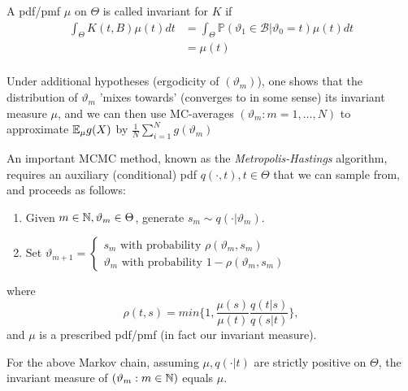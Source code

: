 \documentclass[a4paper]{article}
\begin{document}
A pdf/pmf  $\mu$ on $\Theta$ is called invariant for $K$ if
\begin{align*}
	\int_{\Theta} K(t,B) \mu(t) dt &= \int_{\Theta} \mathbb{P}\left( \vartheta_1 \in \mathcal{B} | \vartheta_0 = t \right) \mu(t) dt \\
	&= \mu(t) \\
\end{align*}

Under additional hypotheses (ergodicity of $(\vartheta_m)$), one shows that the distribution of  $\vartheta_m$ 'mixes towards' (converges to in some sense) its invariant measure $\mu$, and we can then use MC-averages $(\vartheta_m : m=1,\ldots,N)$ to approximate $\mathbb{E}_{\mu} g(X)$ by $\frac{1}{N} \sum_{i=1}^{N}g(\vartheta_m)$

An important MCMC method, known as the \textit{Metropolis-Hastings} algorithm, requires an auxiliary (conditional) pdf $q(\cdot , t), t\in \Theta$ that we can sample from, and proceeds as follows:
\begin{enumerate}
	\item Given $m\in \mathbb{N}, \vartheta_m \in \Theta$, generate $s_m \sim q(\cdot |\vartheta_m)$.
	\item Set $\vartheta_{m+1} = \begin{cases}
			s_m \text{ with probability } \rho(\vartheta_m, s_m) \\
			\vartheta_m \text{ with probability } 1 - \rho(\vartheta_m, s_m)
	\end{cases}$ 
\end{enumerate}
where
\[         
	\rho(t,s) = min\{ 1,  \frac{\mu(s)}{\mu(t)} \frac{q(t|s)}{q(s|t)} \} 
,\]        
and $\mu$ is a prescribed pdf/pmf (in fact our invariant measure).

\begin{prop}
	For the above Markov chain, assuming $\mu, q(\cdot |t)$ are strictly positive on $\Theta$, the invariant measure of $(\vartheta_m : m \in \mathbb{N})$ equals $\mu$.
\end{prop}
\end{document}
